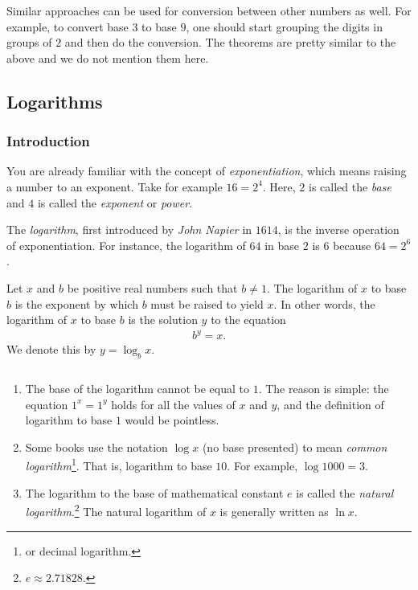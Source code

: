 \documentclass{subfile}
\begin{document}
	Similar approaches can be used for conversion between other numbers as well. For example, to convert base $3$ to base $9$, one should start grouping the digits in groups of $2$ and then do the conversion. The theorems are pretty similar to the above and we do not mention them here.

\subsection{Logarithms}\label{sec:logarithm}
	\subsubsection{Introduction}
	You are already familiar with the concept of \textit{exponentiation}, which means raising a number to an exponent. Take for example $16=2^4$. Here, $2$ is called the \textit{base} and $4$ is called the \textit{exponent} or \textit{power}.

	The \textit{logarithm}, first introduced by \textit{John Napier} in $1614$, is the inverse operation of exponentiation. For instance, the logarithm of $64$ in base $2$ is $6$ because $64=2^6$.

	\begin{definition}
		Let $x$ and $b$ be positive real numbers such that $b \neq 1$. The logarithm of $x$ to base $b$ is the exponent by which $b$ must be raised to yield $x$.  In other words, the logarithm of $x$ to base $b$ is the solution $y$ to the equation
		\begin{align*}
			b^y = x.
		\end{align*}
		We denote this by $y = \log_b x$.
	\end{definition}

	\begin{remark}
		$ $
		\begin{enumerate}
			\item The base of the logarithm cannot be equal to $1$. The reason is simple: the equation $1^x = 1^y$ holds for all the values of $x$ and $y$, and the definition of logarithm to base $1$ would be pointless.

			\item Some books use the notation $\log x$ (no base presented) to mean \textit{common logarithm}\footnote{or decimal logarithm.}. That is, logarithm to base $10$. For example, $\log 1000=3$.

			\item The logarithm to the base of mathematical constant $e$ is called the \textit{natural logarithm}.\footnote{$e\approx 2.71828.$} The natural logarithm of $x$ is generally written as $\ln x$.
		\end{enumerate}
	\end{remark}
\end{document}
